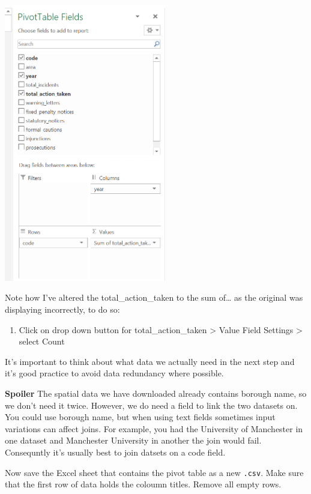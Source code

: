 \documentclass[]{book}
\providecommand{\tightlist}{%
  \setlength{\itemsep}{0pt}\setlength{\parskip}{0pt}}
\begin{document}
\begin{center}\includegraphics[width=200pt]{prac1_images/pivot_example} \end{center}

Note how I've altered the total\_action\_taken to the sum of\ldots{} as the original was displaying incorrectly, to do so:

\begin{enumerate}
\def\labelenumi{\arabic{enumi}.}
\tightlist
\item
  Click on drop down button for total\_action\_taken \textgreater{} Value Field Settings \textgreater{} select Count
\end{enumerate}

It's important to think about what data we actually need in the next step and it's good practice to avoid data redundancy where possible.

\textbf{Spoiler} The spatial data we have downloaded already contains borough name, so we don't need it twice. However, we do need a field to link the two datasets on. You could use borough name, but when using text fields sometimes input variations can affect joins. For example, you had the University of Manchester in one dataset and Manchester University in another the join would fail. Consequntly it's usually best to join datsets on a code field.

Now save the Excel sheet that contains the pivot table as a new \texttt{.csv}. Make sure that the first row of data holds the coloumn titles. Remove all empty rows.
\end{document}
